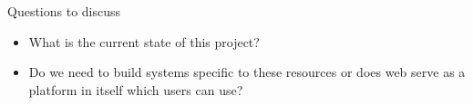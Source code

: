 \documentclass[12pt, onecolumn]{IEEEtran}
\begin{document}
\noindent Questions to discuss
\begin{itemize}
  \item What is the current state of this project?
  \item Do we need to build systems specific to these resources or does web
  serve as a platform in itself which users can use?
\end{itemize}
\bigskip\bigskip



\end{document}
